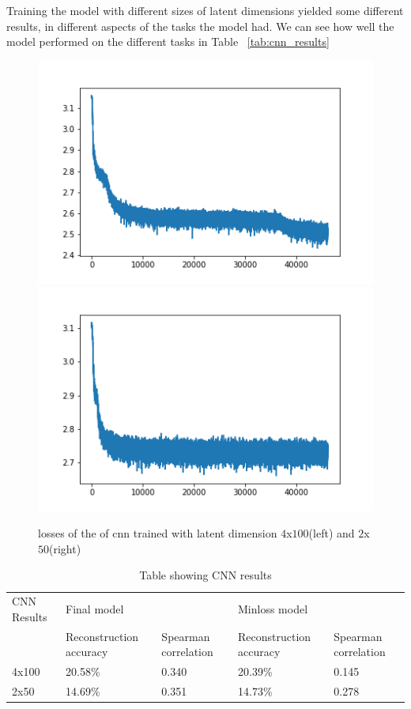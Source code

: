 Training the model with different sizes of latent dimensions yielded some different results, in different aspects of the tasks the model had. We can see how well the model performed on the different tasks in Table ~\ref{tab:cnn_results}\\

\begin{figure}[!ht]
  \centering
  \includegraphics[width=0.4\linewidth]{latex/imgs/CNN_loss_latent_dimension_100.png}
  \includegraphics[width=0.4\linewidth]{latex/imgs/loss_latent_dimension_50.png}
  \caption{losses of the of cnn trained with latent dimension $4$x$100$(left) and $2$x$50$(right)}
  \label{fig:cnn_loss}
\end{figure}

\begin{table}[]
\begin{tabular}{|l|ll|ll|}
\hline
CNN Results & Final model                                  &                      & Minloss model                                &                      \\ \cline{2-5}
            & \multicolumn{1}{l|}{Reconstruction accuracy} & Spearman correlation & \multicolumn{1}{l|}{Reconstruction accuracy} & Spearman correlation \\ \hline
4x100       & \multicolumn{1}{l|}{20.58\%}                 & 0.340                & \multicolumn{1}{l|}{20.39\%}                 & 0.145                \\ \hline
2x50        & \multicolumn{1}{l|}{14.69\%}                 & 0.351                & \multicolumn{1}{l|}{14.73\%}                 & 0.278                \\ \hline
\end{tabular}
\label{fig:cnn_results}
\caption{Table showing CNN results}
\end{table}


